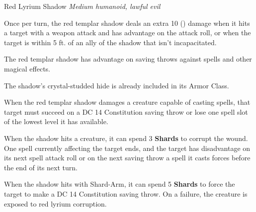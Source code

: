 \documentclass[letterpaper,twocolumn,openany,nodeprecatedcode,breakable,skins,xparse,most]{dndbook}
\begin{document}
\begin{monsterbox}{Red Lyrium Shadow}
\textit{Medium humanoid, lawful evil}\\
\rpghline
\basics[
  armorclass = 15 (lyrium hide),
  hitpoints = 30,
  speed = 45 ft.
]
\rpghline
\stats[
  STR = \stat{16},
  DEX = \stat{20},
  CON = \stat{12},
  INT = \stat{12},
  WIS = \stat{14},
  CHA = \stat{10}
]
\rpghline
\details[
  skills = Investigation +2, Religion +2, Perception +4, Stealth +9,
  senses = passive Perception 14,
  languages = Common,
  challenge = 6
]
\rpghline

\begin{rpg-monsteraction}[Backstab]
Once per turn, the red templar shadow deals an extra 10 () damage when it hits a target with a weapon attack and has advantage on the attack roll, or when the target is within 5 ft. of an ally of the shadow that isn't incapacitated.
\end{rpg-monsteraction}

\begin{rpg-monsteraction}
The red templar shadow has advantage on saving throws against spells and other magical effects.
\end{rpg-monsteraction}

\begin{rpg-monsteraction}
The shadow's crystal-studded hide is already included in its Armor Class.
\end{rpg-monsteraction}

\begin{rpg-monsteraction}
When the red templar shadow damages a creature capable of casting spells, that target must succeed on a DC 14 Constitution saving throw or lose one spell slot of the lowest level it has available.
\end{rpg-monsteraction}

\begin{rpg-monsteraction}
When the shadow hits a creature, it can spend 3 \textbf{Shards} to corrupt the wound. One spell currently affecting the target ends, and the target has disadvantage on its next spell attack roll or on the next saving throw a spell it casts forces before the end of its next turn.
\end{rpg-monsteraction}

\begin{rpg-monsteraction}
When the shadow hits with Shard-Arm, it can spend 5 \textbf{Shards} to force the target to make a DC 14 Constitution saving throw. On a failure, the creature is exposed to red lyrium corruption.
\end{rpg-monsteraction}


\end{monsterbox}
\end{document}

